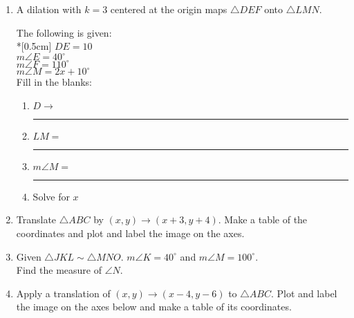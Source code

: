 \documentclass[12pt, twoside]{article}
\begin{document}
\begin{enumerate}
\newpage
\item A dilation with $k=3$ centered at the origin maps $\triangle DEF$ onto $\triangle LMN$. \vspace{0.5cm}
  \begin{multicols}{2}
    The following is given:\\*[0.5cm]
    $DE=10$ \\
    $m\angle E = 40^\circ$ \\
    $m\angle F = 110^\circ$ \\
    $m\angle M = 2x + 10^\circ$ \\
    Fill in the blanks:
    \begin{enumerate}
      \item $D \rightarrow$ \rule{2cm}{0.15mm}
      \item $LM =$ \rule{2cm}{0.15mm}
      \item $m\angle M =$ \rule{2cm}{0.15mm}
      \item Solve for $x$
    \end{enumerate}
  \end{multicols}  \vspace{2cm}

\item Translate $\triangle ABC$ by $(x,y) \rightarrow (x+3, y+4)$. Make a table of the coordinates and plot and label the image on the axes.
  \begin{flushright}
  \end{flushright}

\item Given $\triangle JKL \sim \triangle MNO$. $m\angle K = 40^\circ$ and $m\angle M = 100^\circ$.\\
  Find the measure of $\angle N$. \vspace{3cm}

\newpage
\item Apply a translation of $(x,y) \rightarrow (x-4, y-6)$ to $\triangle ABC$. Plot and label the image on the axes below and make a table of its coordinates.
\begin{flushright}
\end{flushright}


\end{enumerate}
\end{document}
